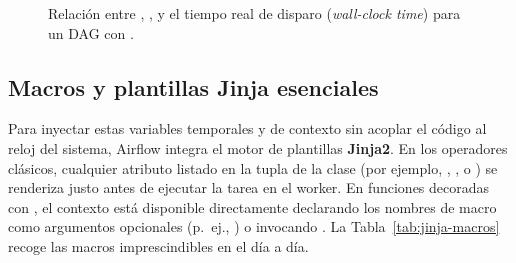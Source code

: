 \begin{figure}[htbp]
{%
}
\caption{Relación entre , ,  y el tiempo real de disparo (\textit{wall-clock time}) para un DAG con .}
\label{fig:timeline-fechas}
\end{figure}

\subsection{Macros y plantillas Jinja esenciales}

Para inyectar estas variables temporales y de contexto sin acoplar el código al reloj del sistema, Airflow integra el motor de plantillas \textbf{Jinja2}. En los operadores clásicos, cualquier atributo listado en la tupla  de la clase (por ejemplo, , ,  o ) se renderiza justo antes de ejecutar la tarea en el worker. En funciones decoradas con , el contexto está disponible directamente declarando los nombres de macro como argumentos opcionales (p.~ej., ) o invocando . La Tabla~\ref{tab:jinja-macros} recoge las macros imprescindibles en el día a día.

